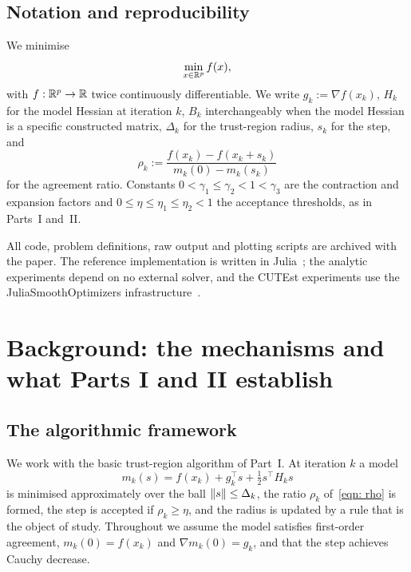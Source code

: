 \documentclass[11pt]{article}
\theoremstyle{plain}
\theoremstyle{definition}
\theoremstyle{remark}
\numberwithin{equation}{section}
\providecommand{\defeq}{\mathrel{:=}}
\newcommand*\Rp{\reals^p}
\begin{document}
\subsection{Notation and reproducibility}

We minimise
\begin{equation}
  \min_{x \in \Rp} f(x),
  \label{eqn: problem}
\end{equation}
with $f : \Rp \to \R$ twice continuously differentiable. We write $g_k \defeq \nabla f(x_k)$,
$H_k$ for the model Hessian at iteration $k$, $B_k$ interchangeably when the model Hessian is a
specific constructed matrix, $\Delta_k$ for the trust-region radius, $s_k$ for the step, and
\begin{equation}
  \rho_k \defeq \frac{f(x_k) - f(x_k + s_k)}{m_k(0) - m_k(s_k)}
  \label{eqn: rho}
\end{equation}
for the agreement ratio. Constants $0 < \gamma_1 \leq \gamma_2 < 1 < \gamma_3$ are the
contraction and expansion factors and $0 \leq \eta \leq \eta_1 \leq \eta_2 < 1$ the acceptance
thresholds, as in Parts~I and~II.

All code, problem definitions, raw output and plotting scripts are archived with the paper. The
reference implementation is written in Julia~\citep{Julia17}; the analytic experiments depend on
no external solver, and the CUTEst experiments use the JuliaSmoothOptimizers
infrastructure~\citep{JSO}.

\section{Background: the mechanisms and what Parts I and II establish}
\label{sec: background}

\subsection{The algorithmic framework}

We work with the basic trust-region algorithm of Part~I. At iteration $k$ a model
\begin{equation}
  m_k(s) = f(x_k) + g_k^\top s + \tfrac12 s^\top H_k s
  \label{eqn: model}
\end{equation}
is minimised approximately over the ball $\left \lVert s \right \rVert \leq \Delta_k$, the ratio $\rho_k$
of~\eqref{eqn: rho} is formed, the step is accepted if $\rho_k \geq \eta$, and the radius is
updated by a rule that is the object of study. Throughout we assume the model satisfies
first-order agreement, $m_k(0) = f(x_k)$ and $\nabla m_k(0) = g_k$, and that the step achieves
Cauchy decrease.
\end{document}
